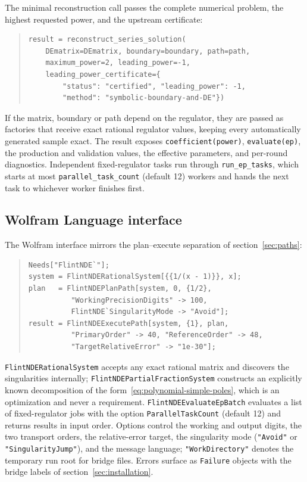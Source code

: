 \documentclass[11pt,a4paper]{article}
\begin{document}
The minimal reconstruction call passes the complete numerical problem, the highest
requested power, and the upstream certificate:
\begin{quote}\small
\begin{verbatim}
result = reconstruct_series_solution(
    DEmatrix=DEmatrix, boundary=boundary, path=path,
    maximum_power=2, leading_power=-1,
    leading_power_certificate={
        "status": "certified", "leading_power": -1,
        "method": "symbolic-boundary-and-DE"})
\end{verbatim}
\end{quote}
If the matrix, boundary or path depend on the regulator, they are passed as factories that
receive exact rational regulator values, keeping every automatically generated sample
exact. The result exposes \texttt{coefficient(power)}, \texttt{evaluate(ep)}, the
production and validation values, the effective parameters, and per-round diagnostics.
Independent fixed-regulator tasks run through \texttt{run\_ep\_tasks}, which starts at
most \texttt{parallel\_task\_count} (default 12) workers and hands the next task to
whichever worker finishes first.

\subsection{Wolfram Language interface}
\label{sec:wolfram}

The Wolfram interface mirrors the plan--execute separation of section~\ref{sec:paths}:
\begin{quote}\small
\begin{verbatim}
Needs["FlintNDE`"];
system = FlintNDERationalSystem[{{1/(x - 1)}}, x];
plan   = FlintNDEPlanPath[system, 0, {1/2},
          "WorkingPrecisionDigits" -> 100,
          FlintNDE`SingularityMode -> "Avoid"];
result = FlintNDEExecutePath[system, {1}, plan,
          "PrimaryOrder" -> 40, "ReferenceOrder" -> 48,
          "TargetRelativeError" -> "1e-30"];
\end{verbatim}
\end{quote}
\texttt{FlintNDERationalSystem} accepts any exact rational matrix and discovers the
singularities internally; \texttt{FlintNDEPartialFractionSystem} constructs an explicitly
known decomposition of the form~\eqref{eq:polynomial-simple-poles}, which is an
optimization and never a requirement. \texttt{FlintNDEEvaluateEpBatch} evaluates a list of
fixed-regulator jobs with the option \texttt{ParallelTaskCount} (default 12) and returns
results in input order. Options control the working and output digits, the two transport
orders, the relative-error target, the singularity mode (\texttt{"Avoid"} or
\texttt{"SingularityJump"}), and the message language; \texttt{"WorkDirectory"} denotes
the temporary run root for bridge files. Errors surface as \texttt{Failure} objects with
the bridge labels of section~\ref{sec:installation}.
\end{document}
